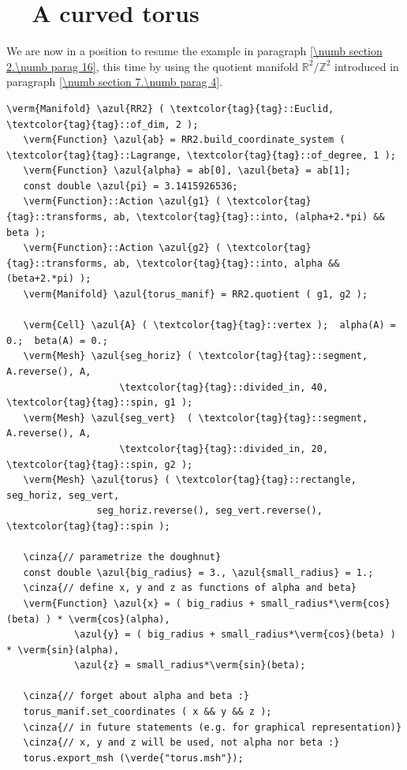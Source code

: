 \section{~~A curved torus}\label{\numb section 7.\numb parag 5}

We are now in a position to resume the example in paragraph \ref{\numb section 2.\numb parag 16},
this time by using the quotient manifold $ \mathbb{R}^2/{\mathbb Z}^2 $ introduced in paragraph
\ref{\numb section 7.\numb parag 4}.

\begin{Verbatim}[commandchars=\\\{\},formatcom=\small\tt,frame=single,
   label=parag-\ref{\numb section 7.\numb parag 5}.cpp,rulecolor=\color{coment},
   baselinestretch=0.94,framesep=2mm                                            ]
   \verm{Manifold} \azul{RR2} ( \textcolor{tag}{tag}::Euclid, \textcolor{tag}{tag}::of_dim, 2 );
   \verm{Function} \azul{ab} = RR2.build_coordinate_system ( \textcolor{tag}{tag}::Lagrange, \textcolor{tag}{tag}::of_degree, 1 );
   \verm{Function} \azul{alpha} = ab[0], \azul{beta} = ab[1];
   const double \azul{pi} = 3.1415926536;
   \verm{Function}::Action \azul{g1} ( \textcolor{tag}{tag}::transforms, ab, \textcolor{tag}{tag}::into, (alpha+2.*pi) && beta );
   \verm{Function}::Action \azul{g2} ( \textcolor{tag}{tag}::transforms, ab, \textcolor{tag}{tag}::into, alpha && (beta+2.*pi) );
   \verm{Manifold} \azul{torus_manif} = RR2.quotient ( g1, g2 );

   \verm{Cell} \azul{A} ( \textcolor{tag}{tag}::vertex );  alpha(A) = 0.;  beta(A) = 0.;
   \verm{Mesh} \azul{seg_horiz} ( \textcolor{tag}{tag}::segment, A.reverse(), A,
                    \textcolor{tag}{tag}::divided_in, 40, \textcolor{tag}{tag}::spin, g1 );
   \verm{Mesh} \azul{seg_vert}  ( \textcolor{tag}{tag}::segment, A.reverse(), A,
                    \textcolor{tag}{tag}::divided_in, 20, \textcolor{tag}{tag}::spin, g2 );
   \verm{Mesh} \azul{torus} ( \textcolor{tag}{tag}::rectangle, seg_horiz, seg_vert,
                seg_horiz.reverse(), seg_vert.reverse(), \textcolor{tag}{tag}::spin );

   \cinza{// parametrize the doughnut}
   const double \azul{big_radius} = 3., \azul{small_radius} = 1.;
   \cinza{// define x, y and z as functions of alpha and beta}
   \verm{Function} \azul{x} = ( big_radius + small_radius*\verm{cos}(beta) ) * \verm{cos}(alpha),
            \azul{y} = ( big_radius + small_radius*\verm{cos}(beta) ) * \verm{sin}(alpha),
            \azul{z} = small_radius*\verm{sin}(beta);

   \cinza{// forget about alpha and beta :}
   torus_manif.set_coordinates ( x && y && z );
   \cinza{// in future statements (e.g. for graphical representation)}
   \cinza{// x, y and z will be used, not alpha nor beta :}
   torus.export_msh (\verde{"torus.msh"});
\end{Verbatim}


